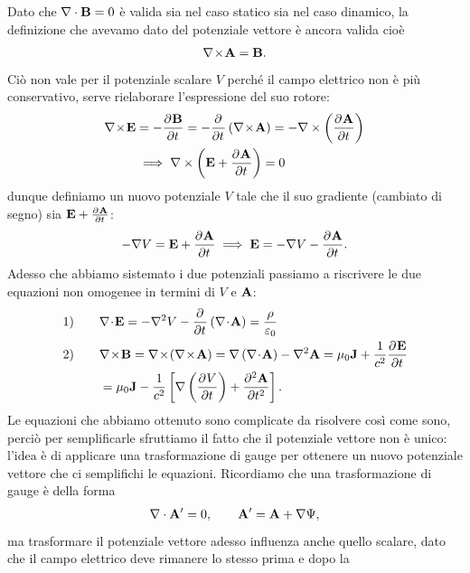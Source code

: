 Dato che $ \nabla \cdot \mathbf{ B } = 0 $ è valida sia nel caso statico sia nel caso dinamico, la definizione che avevamo dato del potenziale vettore è 
ancora valida cioè
\begin{align}
  \nabla\!\times\!\mathbf{ A } = \mathbf{ B }.
\end{align}
Ciò non vale per il potenziale scalare $ V $ perché il campo elettrico non è più conservativo, serve rielaborare l'espressione del suo rotore:
\begin{align}
  \nabla\!\times\!\mathbf{ E } &= -\frac{\partial^{} {\mathbf{ B }}}{\partial {t}^{}} = - \frac{\partial^{} {}}{\partial {t}^{}} \left( \nabla\!\times\!\mathbf{ A } \right) 
  = - \nabla \times \left( \frac{\partial^{} {\mathbf{ A }}}{\partial {t}^{}} \right) 
  \\
  &\implies \nabla \times \left( \mathbf{ E } + \frac{\partial^{} {\mathbf{ A }}}{\partial {t}^{}} \right) = 0
\end{align}
dunque definiamo un nuovo potenziale $ V $ tale che il suo gradiente (cambiato di segno) sia $ \mathbf{ E } + \frac{\partial^{} {\mathbf{ A }}}{\partial {t}^{}} $:
\begin{align}
  -\nabla V = \mathbf{ E } + \frac{\partial^{} {\mathbf{ A }}}{\partial {t}^{}} \implies \mathbf{ E } = - \nabla V - \frac{\partial^{} {\mathbf{ A }}}{\partial {t}^{}}.
\end{align}
Adesso che abbiamo sistemato i due potenziali passiamo a riscrivere le due equazioni non omogenee in termini di $ V $ e $ \mathbf{ A } $:
\begin{align}
  \left.1\right)\qquad &\nabla\!\cdot\!\v{ E } = - \nabla^2 V - \der{}{t} \left( \nabla\!\cdot\!\v{ A } \right) = \frac{\rho}{\eps_0}
  \\
  \left.2\right)\qquad &\nabla\!\times\!\v{ B } = \nabla\!\times\!\left( \nabla\!\times\!\v{ A } \right) 
  = \nabla \left( \nabla\!\cdot\!\v{ A } \right) - \nabla^2 \v{ A } = \mu_0 \v{ J } + \frac{1}{c^2} \der{\v{ E }}{t} 
  \\
  &= \mu_0 \v{ J } - \frac{1}{c^2}\left[ \nabla \left( \der{V}{t} \right) + \der[2]{\v{ A }}{t} \right].
\end{align}
Le equazioni che abbiamo ottenuto sono complicate da risolvere così come sono, perciò per semplificarle sfruttiamo il fatto che il potenziale vettore 
non è unico: l'idea è di applicare una trasformazione di gauge per ottenere un nuovo potenziale vettore che ci semplifichi le equazioni. Ricordiamo 
che una trasformazione di gauge è della forma
\begin{align}
  \nabla \cdot \mathbf{ A }' = 0, \qquad \mathbf{ A }' = \mathbf{ A } + \nabla \Psi,
\end{align}
ma trasformare il potenziale vettore adesso influenza anche quello scalare, dato che il campo elettrico deve rimanere lo stesso prima e dopo la 
